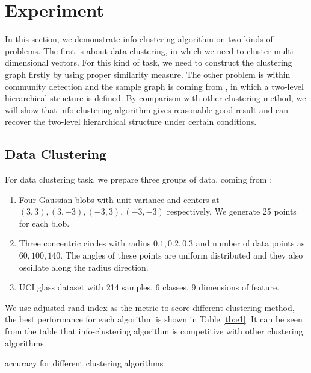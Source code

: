 \documentclass{article}
\begin{document}
\section{Experiment}\label{sec:experiment}
In this section, we demonstrate info-clustering algorithm on two kinds of problems. The first is about data clustering, in which we need to cluster multi-dimensional vectors. For this kind of task, we need to construct the clustering graph firstly by using proper similarity measure. The other problem is within community detection and the sample graph is coming from \cite{RN22}, in which a two-level hierarchical structure is defined. By comparison with other clustering method, we will show that info-clustering algorithm gives reasonable good result and can recover the two-level hierarchical structure under certain conditions. 

\subsection{Data Clustering}\label{sec:fc}
For data clustering task, we prepare three groups of data, coming from \cite{RN7}:
\begin{enumerate}
\item Four Gaussian blobs with unit variance and centers at $(3,3), (3,-3), (-3,3), (-3,-3)$ respectively.  We generate 25 points for each blob.
\item Three concentric circles with radius $0.1,0.2,0.3$ and number of data points as $60, 100, 140$. The angles of these points are uniform distributed and they also oscillate along the radius direction.
\item UCI glass dataset with 214 samples, 6 classes, 9 dimensions of feature.
\end{enumerate}
We use adjusted rand index as the metric to score different clustering method, the best performance for each algorithm is shown in Table \ref{tb:e1}.  It can be seen from the table that info-clustering algorithm is competitive with other clustering algorithms.
\begin{table}[!ht]
\centering
{}
\caption{ accuracy for different clustering algorithms }\label{tb:e1}
\end{table}
\end{document}
